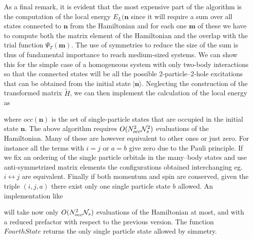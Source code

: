 As a final remark, it is evident that the most expensive part of the algorithm is the computation of the local energy $E_L(\mathbf{n}$ since it will require
a sum over all states connected to $\mathbf{n}$ from the Hamiltonian and for each one $\mathbf{m}$ of these we have to compute both the matrix element of 
the Hamiltonian and the overlap with the trial function $\Psi_T(\mathbf{m})$. The use of symmetries to reduce the size of the sum is thus
of fundamental importance to reach medium-sized systems. We can show this for the simple case of a homogeneous system with only two-body interactions
so that the connected states will be all the possible 2-particle--2-hole excitations that can be obtained from the initial state $\rvert\mathbf{n}\rangle$.
Neglecting the construction of the transformed matrix $\widetilde{H}$, we can then implement the calculation of the local energy as
\begin{algorithmic} 
      \EndFor
    \EndFor
  \EndFor
\EndFor
{}
\end{algorithmic}
where $occ(\mathbf{n})$ is the set of single-particle states that are occupied in the initial state $\mathbf{n}$. The above algorithm requires $O(N_{occ}^2{\cal N}_s^2)$
evaluations of the Hamiltonian. Many of these are however equivalent to other ones or just zero. For instance all the terms with $i=j$ or $a=b$ give zero
due to the Pauli principle. If we fix an ordering of the single particle orbitals in the many--body states and use anti-symmetrized matrix elements the configurations 
obtained interchanging eg. $i\leftrightarrow j$ are equivalent. Finally if both momentum and spin are conserved, given the triple $(i,j,a)$ there exist only one single
particle state $b$ allowed. An implementation like
\begin{algorithmic} 
      \EndIf
    \EndFor
  \EndFor
\EndFor
\end{algorithmic}
will take now only $O(N_{occ}^2{\cal N}_s)$ evaluations of the Hamiltonian at most, and with a reduced prefactor with respect to the previous version. The function $FourthState$ returns 
the only single particle state allowed by simmetry. 

